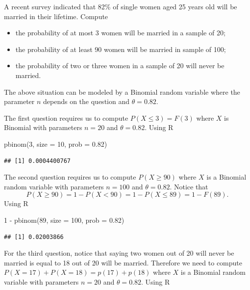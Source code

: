 \documentclass[
]{book}
\newenvironment{Shaded}{\begin{snugshade}}{\end{snugshade}}
\newcommand{\AttributeTok}[1]{\textcolor[rgb]{0.77,0.63,0.00}{#1}}
\newcommand{\DecValTok}[1]{\textcolor[rgb]{0.00,0.00,0.81}{#1}}
\newcommand{\FloatTok}[1]{\textcolor[rgb]{0.00,0.00,0.81}{#1}}
\newcommand{\FunctionTok}[1]{\textcolor[rgb]{0.00,0.00,0.00}{#1}}
\newcommand{\NormalTok}[1]{#1}
\newcommand{\SpecialCharTok}[1]{\textcolor[rgb]{0.00,0.00,0.00}{#1}}
\begin{document}
A recent survey indicated that 82\% of single women aged 25 years old will be married in their lifetime. Compute

\begin{itemize}
\item
  the probability of at most 3 women will be married in a sample of 20;
\item
  the probability of at least 90 women will be married in sample of 100;
\item
  the probability of two or three women in a sample of 20 will never be married.
\end{itemize}

The above situation can be modeled by a Binomial random variable where the parameter \(n\) depends on the question and \(\theta = 0.82\).

The first question requires us to compute \(P(X\leq 3)= F(3)\) where \(X\) is Binomial with parameters \(n=20\) and \(\theta =0.82\). Using R

\begin{Shaded}
\begin{Highlighting}[]
\FunctionTok{pbinom}\NormalTok{(}\DecValTok{3}\NormalTok{, }\AttributeTok{size =} \DecValTok{10}\NormalTok{, }\AttributeTok{prob =} \FloatTok{0.82}\NormalTok{)}
\end{Highlighting}
\end{Shaded}

\begin{verbatim}
## [1] 0.0004400767
\end{verbatim}

The second question requires us to compute \(P(X\geq 90)\) where \(X\) is a Binomial random variable with parameters \(n=100\) and \(\theta = 0.82\). Notice that
\[
P(X\geq 90) = 1 - P(X< 90) = 1 - P(X\leq 89) = 1 - F(89).
\]
Using R

\begin{Shaded}
\begin{Highlighting}[]
\DecValTok{1} \SpecialCharTok{{-}} \FunctionTok{pbinom}\NormalTok{(}\DecValTok{89}\NormalTok{, }\AttributeTok{size =} \DecValTok{100}\NormalTok{,  }\AttributeTok{prob =} \FloatTok{0.82}\NormalTok{)}
\end{Highlighting}
\end{Shaded}

\begin{verbatim}
## [1] 0.02003866
\end{verbatim}

For the third question, notice that saying two women out of 20 will never be married is equal to 18 out of 20 will be married. Therefore we need to compute \(P(X=17) + P(X=18)= p(17) + p(18)\) where \(X\) is a Binomial random variable with parameters \(n=20\) and \(\theta = 0.82\). Using R
\end{document}
